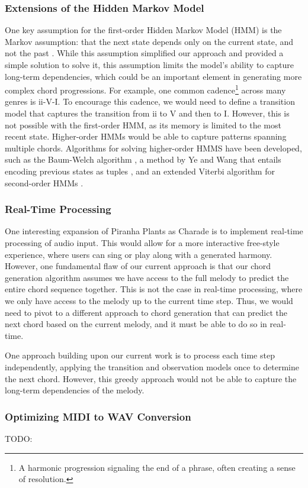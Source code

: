 \subsubsection{Extensions of the Hidden Markov Model}

One key assumption for the first-order Hidden Markov Model (HMM) is the Markov assumption: that the next state depends only on the current state, and not the past \autocite{SpeechLang:2025}. While this assumption simplified our approach and provided a simple solution to solve it, this assumption limits the model's ability to capture long-term dependencies, which could be an important element in generating more complex chord progressions. For example, one common cadence\footnote{A harmonic progression signaling the end of a phrase, often creating a sense of resolution.} across many genres is ii-V-I. To encourage this cadence, we would need to define a transition model that captures the transition from ii to V and then to I. However, this is not possible with the first-order HMM, as its memory is limited to the most recent state. Higher-order HMMs would be able to capture patterns spanning multiple chords. Algorithms for solving higher-order HMMS have been developed, such as the Baum-Welch algorithm \autocite{BaumWelch:1970}, a method by Ye and Wang that entails encoding previous states as tuples \autocite{DecodeHMM:2014}, and an extended Viterbi algorithm for second-order HMMs \autocite{Viterbi2:1988}.

\subsubsection{Real-Time Processing}

One interesting expansion of Piranha Plants as Charade is to implement real-time processing of audio input. This would allow for a more interactive free-style experience, where users can sing or play along with a generated harmony. However, one fundamental flaw of our current approach is that our chord generation algorithm assumes we have access to the full melody to predict the entire chord sequence together. This is not the case in real-time processing, where we only have access to the melody up to the current time step. Thus, we would need to pivot to a different approach to chord generation that can predict the next chord based on the current melody, and it must be able to do so in real-time.

One approach building upon our current work is to process each time step independently, applying the transition and observation models once to determine the next chord. However, this greedy approach would not be able to capture the long-term dependencies of the melody.

\subsubsection{Optimizing MIDI to WAV Conversion}

TODO:
